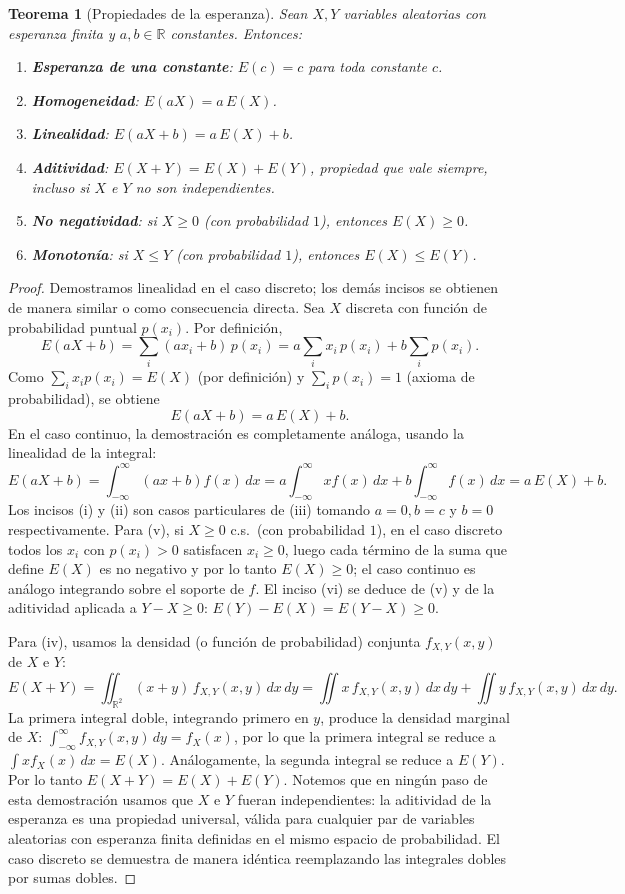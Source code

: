 \documentclass[11pt,a4paper]{article}
\theoremstyle{plain}
\newtheorem{teorema}{Teorema}[section]
\theoremstyle{definition}
\theoremstyle{remark}
\begin{document}
\begin{teorema}[Propiedades de la esperanza]
Sean $X,Y$ variables aleatorias con esperanza finita y $a,b\in\mathbb{R}$ constantes. Entonces:
\begin{enumerate}[label=(\roman*)]
\item \textbf{Esperanza de una constante}: $E(c)=c$ para toda constante $c$.
\item \textbf{Homogeneidad}: $E(aX) = a\,E(X)$.
\item \textbf{Linealidad}: $E(aX+b) = a\,E(X)+b$.
\item \textbf{Aditividad}: $E(X+Y) = E(X)+E(Y)$, propiedad que vale \emph{siempre}, incluso si $X$ e $Y$ no son independientes.
\item \textbf{No negatividad}: si $X\geq 0$ (con probabilidad $1$), entonces $E(X)\geq 0$.
\item \textbf{Monotonía}: si $X\leq Y$ (con probabilidad $1$), entonces $E(X)\leq E(Y)$.
\end{enumerate}
\end{teorema}

\begin{proof}
Demostramos linealidad en el caso discreto; los demás incisos se obtienen de manera similar o como consecuencia directa. Sea $X$ discreta con función de probabilidad puntual $p(x_i)$. Por definición,
\[
E(aX+b) = \sum_i (ax_i+b)\,p(x_i) = a\sum_i x_i\,p(x_i) + b\sum_i p(x_i).
\]
Como $\sum_i x_i p(x_i)=E(X)$ (por definición) y $\sum_i p(x_i)=1$ (axioma de probabilidad), se obtiene
\[
E(aX+b) = a\,E(X)+b.
\]
En el caso continuo, la demostración es completamente análoga, usando la linealidad de la integral:
\[
E(aX+b) = \int_{-\infty}^\infty (ax+b)f(x)\,dx = a\int_{-\infty}^\infty xf(x)\,dx + b\int_{-\infty}^\infty f(x)\,dx = a\,E(X)+b.
\]
Los incisos (i) y (ii) son casos particulares de (iii) tomando $a=0,b=c$ y $b=0$ respectivamente. Para (v), si $X\geq0$ c.s.\ (con probabilidad $1$), en el caso discreto todos los $x_i$ con $p(x_i)>0$ satisfacen $x_i\geq0$, luego cada término de la suma que define $E(X)$ es no negativo y por lo tanto $E(X)\geq0$; el caso continuo es análogo integrando sobre el soporte de $f$. El inciso (vi) se deduce de (v) y de la aditividad aplicada a $Y-X\geq0$: $E(Y)-E(X)=E(Y-X)\geq0$.

Para (iv), usamos la densidad (o función de probabilidad) conjunta $f_{X,Y}(x,y)$ de $X$ e $Y$:
\[
E(X+Y) = \iint_{\mathbb{R}^2} (x+y)\,f_{X,Y}(x,y)\,dx\,dy = \iint x\,f_{X,Y}(x,y)\,dx\,dy + \iint y\,f_{X,Y}(x,y)\,dx\,dy.
\]
La primera integral doble, integrando primero en $y$, produce la densidad marginal de $X$: $\int_{-\infty}^\infty f_{X,Y}(x,y)\,dy = f_X(x)$, por lo que la primera integral se reduce a $\int x f_X(x)\,dx = E(X)$. Análogamente, la segunda integral se reduce a $E(Y)$. Por lo tanto $E(X+Y)=E(X)+E(Y)$. Notemos que en ningún paso de esta demostración usamos que $X$ e $Y$ fueran independientes: la aditividad de la esperanza es una propiedad universal, válida para cualquier par de variables aleatorias con esperanza finita definidas en el mismo espacio de probabilidad. El caso discreto se demuestra de manera idéntica reemplazando las integrales dobles por sumas dobles.
\end{proof}
\end{document}
